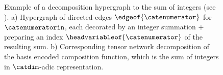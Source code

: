 \begin{example}
\begin{figure}[t]
\begin{center}
\begin{tikzpicture}[scale=0.35, thick]
            \end{tikzpicture}
        \end{center}
        \caption{Example of a decomposition hypergraph to the sum of integers (see ).
        a) Hypergraph of directed edges $\edgeof{\catenumerator}$ for $\catenumeratorin$, each decorated by an integer summation $+$ preparing an index $\headvariableof{\catenumerator}$ of the resulting sum.
        b) Corresponding tensor network decomposition of the basis encoded composition function, which is the sum of integers in $\catdim$-adic representation.}
        \label{fig:decompositionMarySum}
    \end{figure}


%
%
%
%
%
%
%
%
%
%
%

\end{example}

